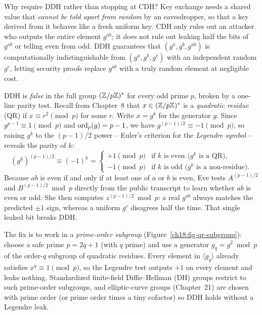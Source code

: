 \begin{whybox}
Why require DDH rather than stopping at CDH? Key exchange needs a shared value that \emph{cannot be told apart from random} by an eavesdropper, so that a key derived from it behaves like a fresh uniform key. CDH only rules out an attacker who outputs the entire element $g^{ab}$; it does not rule out leaking half the bits of $g^{ab}$ or telling even from odd. DDH guarantees that $(g^a, g^b, g^{ab})$ is computationally indistinguishable from $(g^a, g^b, g^c)$ with an independent random $g^c$, letting security proofs replace $g^{ab}$ with a truly random element at negligible cost.
\end{whybox}

\begin{trapbox}
DDH is \emph{false} in the full group $(\mathbb{Z}/p\mathbb{Z})^{*}$ for every odd prime $p$, broken by a one-line parity test. Recall from Chapter~8 that $x \in (\mathbb{Z}/p\mathbb{Z})^{*}$ is a \emph{quadratic residue} (QR) if $x \equiv r^2 \pmod p$ for some $r$. Write $x = g^k$ for the generator $g$. Since $g^{p-1} \equiv 1 \pmod p$ and $\operatorname{ord}_p(g) = p-1$, we have $g^{(p-1)/2} \equiv -1 \pmod p$, so raising $g^k$ to the $(p-1)/2$ power -- Euler's criterion for the \emph{Legendre symbol} -- reveals the parity of $k$:
\[
  (g^k)^{(p-1)/2} \equiv (-1)^k =
  \begin{cases}
    +1 \pmod p & \text{if $k$ is even ($g^k$ is a QR)}, \\
    -1 \pmod p & \text{if $k$ is odd ($g^k$ is a non-residue)}.
  \end{cases}
\]
Because $ab$ is even if and only if at least one of $a$ or $b$ is even, Eve tests $A^{(p-1)/2}$ and $B^{(p-1)/2} \bmod p$ directly from the public transcript to learn whether $ab$ is even or odd. She then computes $z^{(p-1)/2} \bmod p$: a real $g^{ab}$ always matches the predicted $\pm 1$ sign, whereas a uniform $g^c$ disagrees half the time. That single leaked bit breaks DDH.

The fix is to work in a \emph{prime-order subgroup} (Figure~\ref{ch18:fig-qr-subgroup}): choose a safe prime $p = 2q+1$ (with $q$ prime) and use a generator $g_q = g^2 \bmod p$ of the order-$q$ subgroup of quadratic residues. Every element in $\langle g_q \rangle$ already satisfies $x^q \equiv 1 \pmod p$, so the Legendre test outputs $+1$ on every element and leaks nothing. Standardized finite-field Diffie--Hellman (DH) groups restrict to such prime-order subgroups, and elliptic-curve groups (Chapter~21) are chosen with prime order (or prime order times a tiny cofactor) so DDH holds without a Legendre leak.
\end{trapbox}

